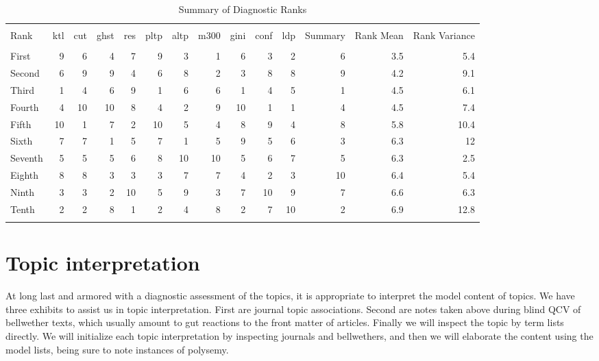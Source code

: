 \documentclass[]{book}
\theoremstyle{definition}
\theoremstyle{definition}
\theoremstyle{definition}
\theoremstyle{remark}
\begin{document}
\begin{table}[!htbp] \centering 
  \caption{Summary of Diagnostic Ranks} 
  \label{tab:sumrnk} 
\begin{tabular}{@{\extracolsep{5pt}} lrrrrrrrrrrrrr} 
\\[-1.8ex]\hline 
\hline \\[-1.8ex] 
Rank & ktl & cut & ghst & res & pltp & altp & m300 & gini & conf & ldp & Summary & Rank Mean & Rank Variance \\ 
\hline \\[-1.8ex] 
First & 9 & 6 & 4 & 7 & 9 & 3 & 1 & 6 & 3 & 2 & 6 & 3.5 & 5.4 \\ 
Second & 6 & 9 & 9 & 4 & 6 & 8 & 2 & 3 & 8 & 8 & 9 & 4.2 & 9.1 \\ 
Third & 1 & 4 & 6 & 9 & 1 & 6 & 6 & 1 & 4 & 5 & 1 & 4.5 & 6.1 \\ 
Fourth & 4 & 10 & 10 & 8 & 4 & 2 & 9 & 10 & 1 & 1 & 4 & 4.5 & 7.4 \\ 
Fifth & 10 & 1 & 7 & 2 & 10 & 5 & 4 & 8 & 9 & 4 & 8 & 5.8 & 10.4 \\ 
Sixth & 7 & 7 & 1 & 5 & 7 & 1 & 5 & 9 & 5 & 6 & 3 & 6.3 & 12 \\ 
Seventh & 5 & 5 & 5 & 6 & 8 & 10 & 10 & 5 & 6 & 7 & 5 & 6.3 & 2.5 \\ 
Eighth & 8 & 8 & 3 & 3 & 3 & 7 & 7 & 4 & 2 & 3 & 10 & 6.4 & 5.4 \\ 
Ninth & 3 & 3 & 2 & 10 & 5 & 9 & 3 & 7 & 10 & 9 & 7 & 6.6 & 6.3 \\ 
Tenth & 2 & 2 & 8 & 1 & 2 & 4 & 8 & 2 & 7 & 10 & 2 & 6.9 & 12.8 \\ 
\hline \\[-1.8ex] 
\end{tabular} 
\end{table}

\hypertarget{topic-interpretation}{%
\section{Topic interpretation}\label{topic-interpretation}}

At long last and armored with a diagnostic assessment of the topics, it
is appropriate to interpret the model content of topics. We have three
exhibits to assist us in topic interpretation. First are journal topic
associations. Second are notes taken above during blind QCV of
bellwether texts, which usually amount to gut reactions to the front
matter of articles. Finally we will inspect the topic by term lists
directly. We will initialize each topic interpretation by inspecting
journals and bellwethers, and then we will elaborate the content using
the model lists, being sure to note instances of polysemy.
\end{document}
